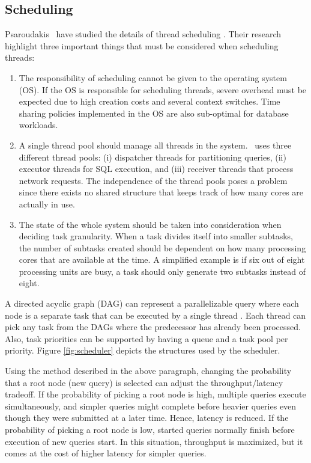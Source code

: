 \subsection{Scheduling}
\label{sub:Scheduling}
Psaroudakis \ea~have studied the details of thread scheduling \cite{Psaroudakis2013-fn}. Their research highlight three important things that must be considered when scheduling threads:
\begin{enumerate}
  \item The responsibility of scheduling cannot be given to the operating system (OS). If the OS is responsible for scheduling threads, severe overhead must be expected due to high creation costs and several context switches. Time sharing policies implemented in the OS are also sub-optimal for database workloads.
  \item A single thread pool should manage all threads in the system. \saph~uses three different thread pools: (i) dispatcher threads for partitioning queries, (ii) executor threads for SQL execution, and (iii) receiver threads that process network requests. The independence of the thread pools poses a problem since there exists no shared structure that keeps track of how many cores are actually in use.
  \item The state of the whole system should be taken into consideration when deciding task granularity. When a task divides itself into smaller subtasks, the number of subtasks created should be dependent on how many processing cores that are available at the time. A simplified example is if six out of eight processing units are busy, a task should only generate two subtasks instead of eight.
\end{enumerate}

A directed acyclic graph (DAG) can represent a parallelizable query where each node is a separate task that can be executed by a single thread \cite{Psaroudakis2013-fn}. Each thread can pick any task from the DAGs where the predecessor has already been processed. Also, task priorities can be supported by having a queue and a task pool per priority. Figure \ref{fig:scheduler} depicts the structures used by the scheduler.

Using the method described in the above paragraph, changing the probability that a root node (new query) is selected can adjust the throughput/latency tradeoff. If the probability of picking a root node is high, multiple queries execute simultaneously, and simpler queries might complete before heavier queries even though they were submitted at a later time. Hence, latency is reduced. If the probability of picking a root node is low, started queries normally finish before execution of new queries start. In this situation, throughput is maximized, but it comes at the cost of higher latency for simpler queries.

